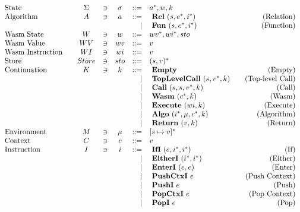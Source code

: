 \begin{align*}
\begin{array}{lcccrlr}
%
  \text{State}\quad& \Sigma &\ni& \sigma & ::=& \seq a, w, k \\
%
  \text{Algorithm}\quad& A &\ni& a &::=& ~ \rel ~ (s, \seq e, \seq i) &\quad\text{(Relation)} \\
  &&&& | & ~ \fun ~ (s, \seq e, \seq i) &\quad\text{(Function)} \\
%
  \text{Wasm State}\quad& W &\ni& w &::=& \seq{wv}, \seq{wi}, sto \\
  \text{Wasm Value}\quad& WV &\ni& wv &::=& v \\
  \text{Wasm Instruction}\quad& WI &\ni& wi &::=& v \\
%
  \text{Store}\quad& Store &\ni& sto &::=& \seq{(s, v)} \\
%
  \text{Continuation}\quad & K &\ni& k &::=& ~ \mt &\quad\text{(Empty)} \\
    &&&& | & ~ \toplevelcall ~ (s, \seq v, k) &\quad\text{(Top-level Call)} \\
    &&&& | & ~ \call ~ (s, s, \seq v, k) &\quad\text{(Call)} \\
    &&&& | & ~ \wasm ~ (\seq c, k) &\quad\text{(Wasm)} \\
    &&&& | & ~ \exe ~ (wi, k) &\quad\text{(Execute)} \\
    &&&& | & ~ \algo ~ (\seq i, \mu, \seq c, k) &\quad\text{(Algorithm)} \\
    &&&& | & ~ \ret ~ (v, k) &\quad\text{(Return)} \\
%
  \text{Environment}\quad& M &\ni& \mu &::=& \seq{[s \mapsto v]} \\
%
  \text{Context}\quad& C &\ni& c &::=& v \\
%
  \text{Instruction}\quad& I &\ni& i &::=& ~ \ifi ~ (e, \seq i, \seq i) &\quad\text{(If)} \\
    &&&& | & ~ \eitheri ~ (\seq i, \seq i) &\quad\text{(Either)} \\
    &&&& | & ~ \enteri ~ (e, e) &\quad\text{(Enter)} \\
    &&&& | & ~ \pushctxi ~ e &\quad\text{(Push Context)} \\
    &&&& | & ~ \pushi ~ e &\quad\text{(Push)} \\
    &&&& | & ~ \popctxi ~ e &\quad\text{(Pop Context)} \\
    &&&& | & ~ \popi ~ e &\quad\text{(Pop)} \\

\end{array}
\end{align*}
